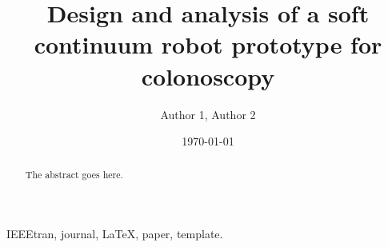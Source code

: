 \documentclass[journal,onecolumn]{IEEEtran}
\author{Author 1, Author 2}
\date{\today}
\title{Design and analysis of a soft continuum robot prototype for colonoscopy}
\begin{document}
\maketitle




\begin{abstract}
The abstract goes here.
\end{abstract}

\begin{IEEEkeywords}
IEEEtran, journal, \LaTeX, paper, template.
\end{IEEEkeywords}

\IEEEpeerreviewmaketitle
\end{document}
